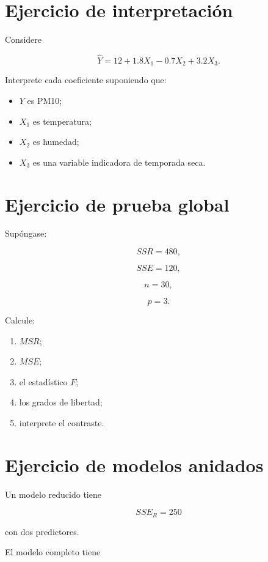 \documentclass[
  spanish,
  11pt,
  letterpaper,
  DIV=11,
  numbers=noendperiod]{scrreprt}
\providecommand{\tightlist}{%
  \setlength{\itemsep}{0pt}\setlength{\parskip}{0pt}}
\theoremstyle{definition}
\theoremstyle{plain}
\theoremstyle{definition}
\theoremstyle{remark}
\begin{document}
\section{Ejercicio de
interpretación}\label{ejercicio-de-interpretaciuxf3n}

Considere

\[
\widehat{Y}
=
12
+
1.8X_1
-
0.7X_2
+
3.2X_3.
\]

Interprete cada coeficiente suponiendo que:

\begin{itemize}
\tightlist
\item
  \(Y\) es PM10;
\item
  \(X_1\) es temperatura;
\item
  \(X_2\) es humedad;
\item
  \(X_3\) es una variable indicadora de temporada seca.
\end{itemize}

\section{Ejercicio de prueba global}\label{ejercicio-de-prueba-global}

Supóngase:

\[
SSR=480,
\]

\[
SSE=120,
\]

\[
n=30,
\]

\[
p=3.
\]

Calcule:

\begin{enumerate}
\def\labelenumi{\arabic{enumi}.}
\tightlist
\item
  \(MSR\);
\item
  \(MSE\);
\item
  el estadístico \(F\);
\item
  los grados de libertad;
\item
  interprete el contraste.
\end{enumerate}

\section{Ejercicio de modelos
anidados}\label{ejercicio-de-modelos-anidados}

Un modelo reducido tiene

\[
SSE_R=250
\]

con dos predictores.

El modelo completo tiene
\end{document}
